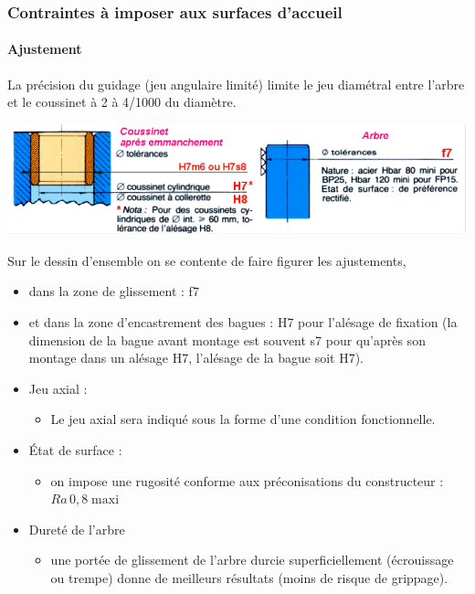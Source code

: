 \documentclass[11pt,oneside]{article}
\begin{document}
\subsubsection{Contraintes à imposer aux surfaces d'accueil}
\paragraph*{Ajustement}
La précision du guidage (jeu angulaire limité) limite le jeu diamétral entre l'arbre et le coussinet  à 2 à 4/1000 du diamètre.

\begin{center}
\includegraphics[width=.9\textwidth]{png/fig18}
\end{center}
 
Sur le dessin d'ensemble on se contente de faire figurer les ajustements, 
\begin{itemize}
\item dans la zone de glissement : f7 
\item et dans la zone d'encastrement des bagues : H7 pour l'alésage de fixation (la dimension de la bague avant montage est souvent s7 pour qu'après son montage dans un alésage H7, l'alésage de la bague soit H7).
\end{itemize}

\begin{itemize}
\item Jeu axial :
\begin{itemize}
\item Le jeu axial sera indiqué sous la forme d'une condition fonctionnelle.
\end{itemize}
\item État de surface :
\begin{itemize}
\item on impose une rugosité conforme aux préconisations du constructeur : $Ra\, 0,8\; \text{maxi}$
\end{itemize}
\item Dureté de l'arbre
\begin{itemize}
\item une portée de glissement de l'arbre durcie superficiellement (écrouissage ou trempe) donne de meilleurs résultats (moins de risque de grippage).
\end{itemize}
\end{itemize}
\end{document}
